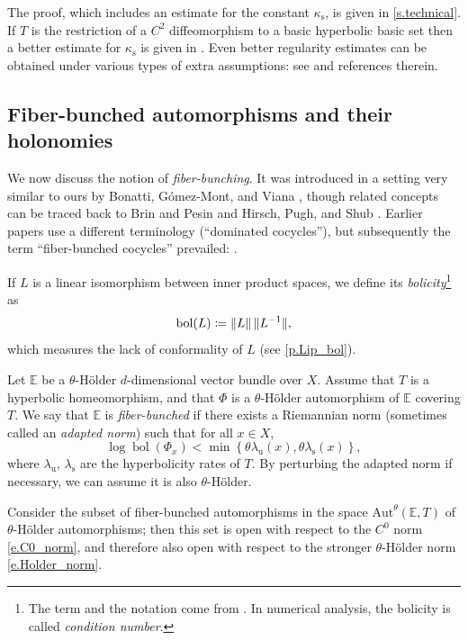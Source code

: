 \documentclass[10pt]{amsart}
\def\vcentcolon{\mathrel{\mathop\ordinarycolon}}
\providecommand\ordinarycolon{:}
\providecommand*\coloneqq{\vcentcolon\mathrel{\mkern-1.2mu}=}
\theoremstyle{plain}
\theoremstyle{definition}
\newcommand{\EE}{\mathbb{E}}
\newcommand{\uu}{\mathrm{u}}
\renewcommand{\ss}{\mathrm{s}}
\newcommand{\Aut}{\mathrm{Aut}}
\DeclareMathOperator{\bol}{bol}
\begin{document}
The proof, which includes an estimate for the constant $\kappa_\ss$, is given in \cref{s.technical}.
If $T$ is the restriction of a $C^2$ diffeomorphism to a basic hyperbolic basic set then a better estimate for $\kappa_\ss$ is given in \cite{SS}. Even better regularity estimates can be obtained under various types of extra assumptions: see \cite{PintoRand} and references therein.

\subsection{Fiber-bunched automorphisms and their holonomies}

We now discuss the notion of \emph{fiber-bunching}.
It was introduced in a setting very similar to ours by \hbox{Bonatti}, Gómez-Mont, and Viana \cite{BGV}, though related concepts can be traced back to Brin and Pesin \cite{BrinP} and Hirsch, Pugh, and Shub \cite{HPS}.
Earlier papers \cite{BGV,BV} use a different terminology (``dominated cocycles''), but subsequently the term ``fiber-bunched cocycles'' prevailed: \cite{AV_Portugalia,AV_Inventiones,KalSad}.

If $L$ is a linear isomorphism between inner product spaces, we define its \emph{bolicity}\footnote{The term and the notation come from \cite{Pugh,PSW1}. In numerical analysis, the bolicity is called \emph{condition number}.} as
\begin{equation} \label{e.def_bol}
\bol(L) \coloneqq \|L\| \, \|L^{-1}\|,
\end{equation}
which measures the lack of conformality of $L$ (see \cref{p.Lip_bol}).

Let $\EE$ be a $\theta$-Hölder $d$-dimensional vector bundle over $X$.
Assume that $T$ is a hyperbolic homeomorphism, and that $\Phi$ is a $\theta$-Hölder automorphism of $\EE$ covering $T$.
We say that $\EE$ is \emph{fiber-bunched}
if there exists a Riemannian norm (sometimes called an \emph{adapted norm})
such that for all $x \in X$,
\begin{equation}\label{e.def_fiber_bunched}
\log \bol(\Phi_x)
< \min \left\{ \theta \lambda_\uu(x), \theta \lambda_\ss(x)\right\},
\end{equation}
where $\lambda_\uu$, $\lambda_\ss$ are the hyperbolicity rates of $T$.
By perturbing the adapted norm if necessary, we can assume it is also $\theta$-Hölder.

Consider the subset of fiber-bunched automorphisms in the space $\Aut^\theta(\EE,T)$ of $\theta$-Hölder automorphisms; then this set is open with respect to the $C^0$ norm \eqref{e.C0_norm}, and therefore also open with respect to the stronger $\theta$-Hölder norm \eqref{e.Holder_norm}.
\end{document}
